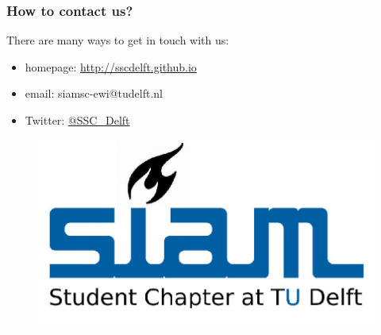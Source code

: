 \documentclass{beamer}
\begin{document}
\begin{frame}
\frametitle{How to contact us?}
There are many ways to get in touch with us:
\begin{itemize}
 \item homepage: \href{http://sscdelft.github.io}{http://sscdelft.github.io}
 \item email: siamsc-ewi@tudelft.nl
 \item Twitter: \href{https://twitter.com/SSC\_Delft}{@SSC\_Delft}
 \end{itemize}
\begin{figure}[t]
\hfill\includegraphics[scale=0.14]{SSC_Delft_new}
\end{figure}
\end{frame}
\end{document}
